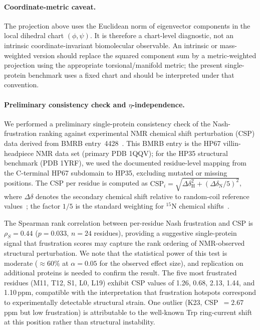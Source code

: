 \documentclass[12pt,a4paper]{article}
\theoremstyle{remark}
\begin{document}
\paragraph{Coordinate-metric caveat.}
The projection above uses the Euclidean norm of eigenvector components in the local dihedral chart $(\phi,\psi)$. It is therefore a chart-level diagnostic, not an intrinsic coordinate-invariant biomolecular observable. An intrinsic or mass-weighted version should replace the squared component sum by a metric-weighted projection using the appropriate torsional/manifold metric; the present single-protein benchmark uses a fixed chart and should be interpreted under that convention.

\paragraph{Preliminary consistency check and $\eta$-independence.}
We performed a preliminary single-protein consistency check of the Nash-frustration ranking against experimental NMR chemical shift perturbation (CSP) data derived from BMRB entry~4428~\citep{BMRB4428}. This BMRB entry is the HP67 villin-headpiece NMR data set (primary PDB 1QQV); for the HP35 structural benchmark (PDB 1YRF), we used the documented residue-level mapping from the C-terminal HP67 subdomain to HP35, excluding mutated or missing positions. The CSP per residue is computed as $\text{CSP}_i = \sqrt{\Delta\delta_{\text{H}}^2 + (\Delta\delta_{\text{N}}/5)^2}$, where $\Delta\delta$ denotes the secondary chemical shift relative to random-coil reference values~\citep{Wishart1995}; the factor $1/5$ is the standard weighting for ${}^{15}$N chemical shifts~\citep{Williamson2013}.

The Spearman rank correlation between per-residue Nash frustration and CSP is $\rho_S = 0.44$ ($p = 0.033$, $n = 24$ residues), providing a suggestive single-protein signal that frustration scores may capture the rank ordering of NMR-observed structural perturbation. We note that the statistical power of this test is moderate ($\approx 60\%$ at $\alpha = 0.05$ for the observed effect size), and replication on additional proteins is needed to confirm the result. The five most frustrated residues (M11, T12, S1, L0, L19) exhibit CSP values of 1.26, 0.68, 2.13, 1.44, and 1.10\,ppm, compatible with the interpretation that frustration hotspots correspond to experimentally detectable structural strain. One outlier (K23, CSP~$= 2.67$\,ppm but low frustration) is attributable to the well-known Trp ring-current shift at this position rather than structural instability.
\end{document}

